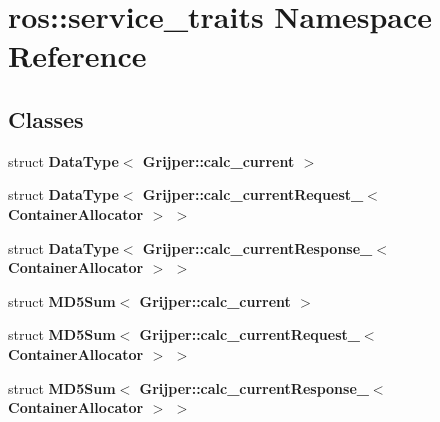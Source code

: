 \section{ros\-:\-:service\-\_\-traits Namespace Reference}
\label{namespaceros_1_1service__traits}
\subsection*{Classes}
\begin{DoxyCompactItemize}
\item 
struct {\bf Data\-Type$<$ Grijper\-::calc\-\_\-current $>$}
\item 
struct {\bf Data\-Type$<$ Grijper\-::calc\-\_\-current\-Request\-\_\-$<$ Container\-Allocator $>$ $>$}
\item 
struct {\bf Data\-Type$<$ Grijper\-::calc\-\_\-current\-Response\-\_\-$<$ Container\-Allocator $>$ $>$}
\item 
struct {\bf M\-D5\-Sum$<$ Grijper\-::calc\-\_\-current $>$}
\item 
struct {\bf M\-D5\-Sum$<$ Grijper\-::calc\-\_\-current\-Request\-\_\-$<$ Container\-Allocator $>$ $>$}
\item 
struct {\bf M\-D5\-Sum$<$ Grijper\-::calc\-\_\-current\-Response\-\_\-$<$ Container\-Allocator $>$ $>$}
\end{DoxyCompactItemize}
